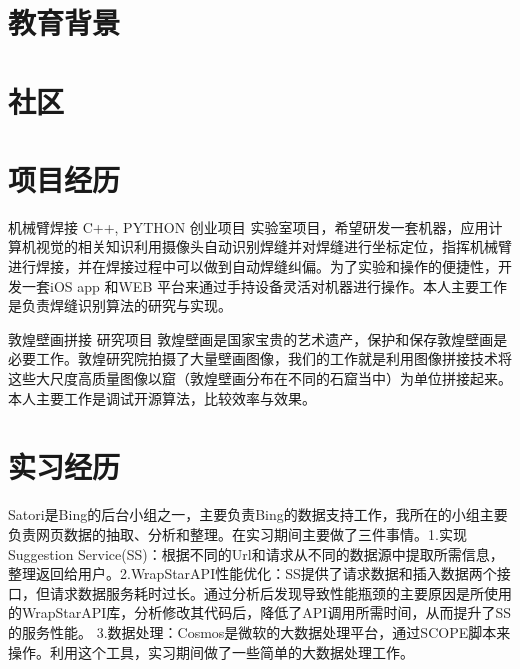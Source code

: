 \documentclass[11pt,a4paper]{moderncv}
\title{}               %
\begin{document}
\maketitle

\section{教育背景}
 {}{} %


\section{社区}

\section{项目经历}
\renewcommand{\baselinestretch}{0.8}

{机械臂焊接}
{C++, PYTHON}
{创业项目}{}
{实验室项目，希望研发一套机器，应用计算机视觉的相关知识利用摄像头自动识别焊缝并对焊缝进行坐标定位，指挥机械臂进行焊接，并在焊接过程中可以做到自动焊缝纠偏。为了实验和操作的便捷性，开发一套iOS app 和WEB 平台来通过手持设备灵活对机器进行操作。本人主要工作是负责焊缝识别算法的研究与实现。}

\vspace*{0.2\baselineskip}
{敦煌壁画拼接}{}
{研究项目}{}
{敦煌壁画是国家宝贵的艺术遗产，保护和保存敦煌壁画是必要工作。敦煌研究院拍摄了大量壁画图像，我们的工作就是利用图像拼接技术将这些大尺度高质量图像以窟（敦煌壁画分布在不同的石窟当中）为单位拼接起来。本人主要工作是调试开源算法，比较效率与效果。}

\section{实习经历}
{Satori是Bing的后台小组之一，主要负责Bing的数据支持工作，我所在的小组主要负责网页数据的抽取、分析和整理。在实习期间主要做了三件事情。1.实现Suggestion Service(SS)：根据不同的Url和请求从不同的数据源中提取所需信息，整理返回给用户。2.WrapStarAPI性能优化：SS提供了请求数据和插入数据两个接口，但请求数据服务耗时过长。通过分析后发现导致性能瓶颈的主要原因是所使用的WrapStarAPI库，分析修改其代码后，降低了API调用所需时间，从而提升了SS的服务性能。
	3.数据处理：Cosmos是微软的大数据处理平台，通过SCOPE脚本来操作。利用这个工具，实习期间做了一些简单的大数据处理工作。}
\end{document}

